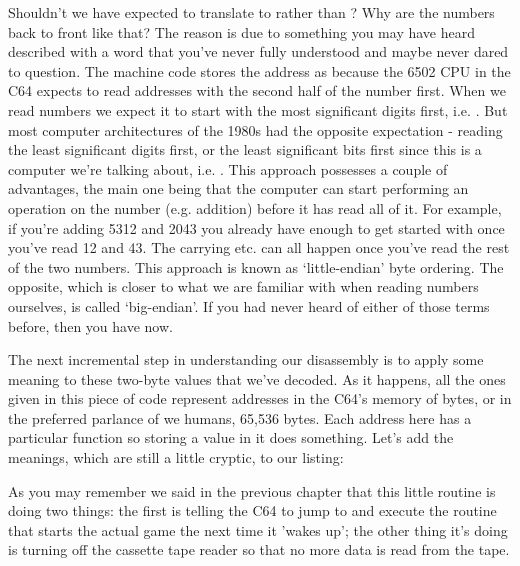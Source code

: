 Shouldn't we have expected  to translate to  rather than 
? Why are the numbers back to front like that? The reason is due to something
you may have heard described with a word that you've never fully understood and maybe never
dared to question. The machine code
stores the address  as  because the 6502 CPU in the C64 expects to read
addresses with the second half of the number first. When we read numbers we expect it to start
with the most significant digits first, i.e. . But most computer architectures of the 1980s had the opposite
expectation - reading the least significant digits first, or the least significant bits first since
this is a computer we're talking about, i.e. . This approach possesses a couple of advantages,
the main one being that the computer can start performing an operation on the number (e.g. addition) before it
has read all of it. For example, if you're adding 5312 and 2043 you already have enough to get started with once
you've read 12 and 43. The carrying etc. can all happen once you've read the rest of the two numbers. This approach
is known as `little-endian' byte ordering. The opposite, which is closer to what we are familiar with when
reading numbers ourselves, is called `big-endian'. If you had never heard of either of those terms before, then
you have now.

The next incremental step in understanding our disassembly is to apply some meaning to these two-byte values
that we've decoded. As it happens, all the ones given in this piece of code represent addresses in the C64's
memory of  bytes, or in the preferred parlance of we humans, 65,536 bytes. Each address here
has a particular function so storing a value in it does something. Let's add the meanings, which are still
a little cryptic, to our listing:

\begin{minipage}[b]{0.20\linewidth}
\centering

\end{minipage}
\hspace{0.5cm}
\begin{minipage}[b]{0.70\linewidth}
\centering

\end{minipage}

As you may remember we said in the previous chapter that this little routine is doing two things: the first
is telling the C64 to jump to and execute the routine that starts the actual game the next time it 'wakes up'; the
other thing it's doing is turning off the cassette tape reader so that no more data is read from the tape.

